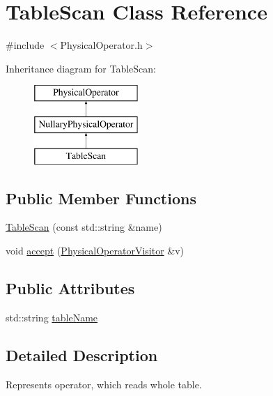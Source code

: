 \hypertarget{class_table_scan}{\section{Table\+Scan Class Reference}
\label{class_table_scan}
}


{\ttfamily \#include $<$Physical\+Operator.\+h$>$}

Inheritance diagram for Table\+Scan\+:\begin{figure}[H]
\begin{center}
\leavevmode
\includegraphics[height=3.000000cm]{class_table_scan}
\end{center}
\end{figure}
\subsection*{Public Member Functions}
\begin{DoxyCompactItemize}
\item 
\hyperlink{class_table_scan_a25018f9d7a3c6b0d0389403ec81cc862}{Table\+Scan} (const std\+::string \&name)
\item 
void \hyperlink{class_table_scan_a51a770478fbad11e95ad5f91dd7af31a}{accept} (\hyperlink{class_physical_operator_visitor}{Physical\+Operator\+Visitor} \&v)
\end{DoxyCompactItemize}
\subsection*{Public Attributes}
\begin{DoxyCompactItemize}
\item 
std\+::string \hyperlink{class_table_scan_a8ac51489c963d33273bfa178a5c033c1}{table\+Name}
\end{DoxyCompactItemize}


\subsection{Detailed Description}
Represents operator, which reads whole table. 

